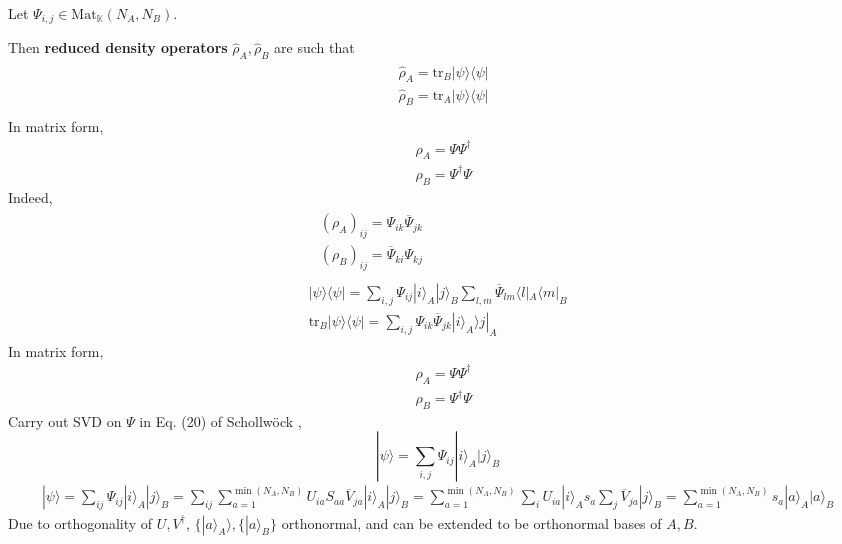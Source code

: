 \documentclass[10pt]{amsart}
\begin{document}
\begin{multicols*}{2}
Let $\Psi_{i,j} \in \text{Mat}_{\mathbb{K}}(N_A,N_B)$.  

Then \textbf{reduced density operators} $\widehat{\rho}_A,\widehat{\rho}_B$ are such that 
\[
\begin{gathered}
\begin{aligned} 
	& \widehat{\rho}_A = \text{tr}_B|\psi \rangle \langle \psi | \\ 
	& \widehat{\rho}_B = \text{tr}_A|\psi \rangle \langle \psi | \\ 
\end{aligned}
\end{gathered}
\]
In matrix form, 
\[
\begin{aligned}
	& \rho_A = \Psi \Psi^{\dag} \\ 
	& \rho_B = \Psi^{\dag} \Psi 
\end{aligned}
\]
Indeed, 
\[
\begin{gathered}
\begin{aligned} 
	& (\rho_A)_{ij} = \Psi_{ik} \overline{\Psi}_{jk} \\
	& (\rho_B)_{ij} = \overline{\Psi}_{ki}  \Psi_{kj} \end{aligned} \\
\begin{gathered}
|\psi \rangle \langle \psi | = \sum_{i,j} \Psi_{ij} |i\rangle_A |j\rangle_B \sum_{l,m} \overline{\Psi}_{lm}\langle l |_A \langle m |_B \\
\text{tr}_B|\psi \rangle \langle \psi | = \sum_{i,j} \Psi_{ik} \overline{\Psi}_{jk} |i \rangle_A \rangle j |_A
\end{gathered}
\end{gathered}
\]
In matrix form, 
\[
\begin{aligned}
	& \rho_A = \Psi \Psi^{\dag} \\ 
	&  \rho_B = \Psi^{\dag} \Psi
\end{aligned}
\]
Carry out SVD on $\Psi$ in Eq. (20) of Schollw\"{o}ck \cite{Scho2010}, 
\[
|\psi \rangle = \sum_{i,j} \Psi_{ij} |i\rangle_A |j\rangle_B
\]
\[
\begin{gathered}
|\psi \rangle = \sum_{ij} \Psi_{ij} | i \rangle_A |j \rangle_B = \sum_{ij} \sum_{a=1}^{\min{(N_A,N_B)}} U_{ia} S_{aa} \overline{V}_{ja} |i \rangle_A | j \rangle_B = \sum_{a=1}^{ \min{(N_A,N_B)}} \sum_i U_{ia} | i \rangle_A s_a \sum_j \overline{V}_{ja} | j \rangle_B = \sum_{a=1}^{ \min{ (N_A,N_B)} } s_a |a \rangle_A |a\rangle_B
\end{gathered}
\]
Due to orthogonality of $U,V^{\dag}$, $\lbrace |a \rangle_A \rangle, \lbrace | a \rangle_B \rbrace$ orthonormal, and can be extended to be orthonormal bases of $A,B$.  


\end{multicols*}
\end{document}
